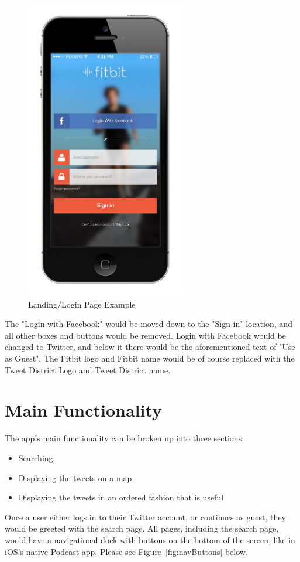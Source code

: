 \documentclass[11pt]{article}
\begin{document}
\begin{figure}[H]
    \centering
    \includegraphics[width=7cm]{loginIdea}
    \caption{Landing/Login Page Example}  
    \label{fig:loginMock}          
\end{figure}

The "Login with Facebook" would be moved down to the "Sign in" location, and all other boxes and buttons would be removed. Login with Facebook would be changed to Twitter, and below it there would be the aforementioned text of "Use as Guest". The Fitbit logo and Fitbit name would be of course replaced with the Tweet District Logo and Tweet District name.

\section{Main Functionality}
The app's main functionality can be broken up into three sections:
\begin{itemize}
\item Searching
\item Displaying the tweets on a map
\item Displaying the tweets in an ordered fashion that is useful
\end{itemize}

Once a user either logs in to their Twitter account, or continues as guest, they would be greeted with the search page. All pages, including the search page, would have a navigational dock with buttons on the bottom of the screen, like in iOS's native Podcast app. Please see Figure~\ref{fig:navButtons} below.
\end{document}

